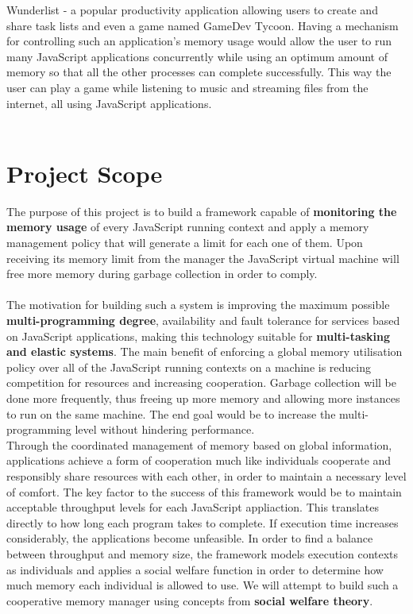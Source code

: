 \documentclass{l4proj}
\begin{document}
Wunderlist - a popular productivity application allowing users to create and share task lists\cite{wunderlist} and even a game named GameDev Tycoon\cite{tycoongame}. 
Having a mechanism for controlling such an application's memory usage would allow the user to run many JavaScript applications concurrently while using an optimum amount of memory so that all the other processes can complete successfully. This way the user can play a game while listening to music and streaming files from the internet, all using JavaScript applications.
\\\\%
\section{Project Scope}
\hspace*{3em} The purpose of this project is to build a framework capable of \textbf{monitoring the memory usage} of every JavaScript running context and apply a memory management policy that will generate a limit for each one of them. Upon receiving its memory limit from the manager the JavaScript virtual machine will free more memory during garbage collection in order to comply.
\\\\ %
\hspace*{3em} The motivation for building such a system is improving the maximum possible \textbf{multi-programming degree}, availability and fault tolerance for services based on JavaScript applications, making this technology suitable for \textbf{multi-tasking and elastic systems}. The main benefit of enforcing a global memory utilisation policy over all of the JavaScript running contexts on a machine is reducing competition for resources and increasing cooperation. Garbage collection will be done more frequently, thus freeing up more memory and allowing more instances to run on the same machine. The end goal would be to increase the multi-programming level without hindering performance.\\
\hspace*{3em} Through the coordinated management of memory based on global information, applications achieve a form of cooperation much like individuals cooperate and responsibly share resources with each other, in order to maintain a necessary level of comfort. The key factor to the success of this framework would be to maintain acceptable throughput levels for each JavaScript appliaction. This translates directly to how long each program takes to complete. If execution time increases considerably, the applications become unfeasible. In order to find a balance between throughput and memory size, the framework models execution contexts as individuals and applies a social welfare function in order to determine how much memory each individual is allowed to use. We will attempt to build such a cooperative memory manager using concepts from \textbf{social welfare theory}.
\end{document}
